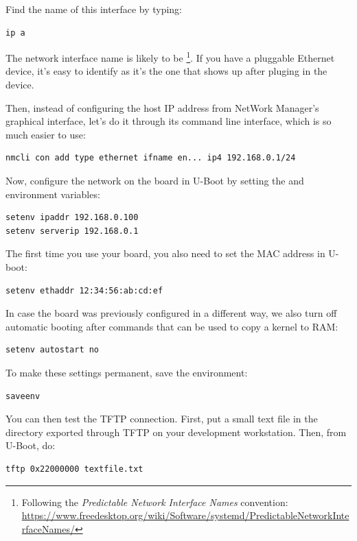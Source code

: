 Find the name of this interface by typing:
\begin{verbatim}
ip a
\end{verbatim}

The network interface name is likely to be
\footnote{Following the {\em Predictable Network Interface
Names} convention:
\url{https://www.freedesktop.org/wiki/Software/systemd/PredictableNetworkInterfaceNames/}}.
If you have a pluggable Ethernet device, it's easy to identify as it's
the one that shows up after pluging in the device.

Then, instead of configuring the host IP address from NetWork Manager’s graphical interface,
let’s do it through its command line interface, which is so much easier to use:

\begin{verbatim}
nmcli con add type ethernet ifname en... ip4 192.168.0.1/24
\end{verbatim}

Now, configure the network on the board in U-Boot by setting the 
and  environment variables:

\begin{verbatim}
setenv ipaddr 192.168.0.100
setenv serverip 192.168.0.1
\end{verbatim}

The first time you use your board, you also need to set the MAC
address in U-boot:

\begin{verbatim}
setenv ethaddr 12:34:56:ab:cd:ef
\end{verbatim}

In case the board was previously configured in a different way, we
also turn off automatic booting after commands that can be used to
copy a kernel to RAM:

\begin{verbatim}
setenv autostart no
\end{verbatim}

To make these settings permanent, save the environment:

\begin{verbatim}
saveenv
\end{verbatim}

You can then test the TFTP connection. First, put a small text file in
the directory exported through TFTP on your development
workstation. Then, from U-Boot, do:

\begin{verbatim}
tftp 0x22000000 textfile.txt
\end{verbatim}

